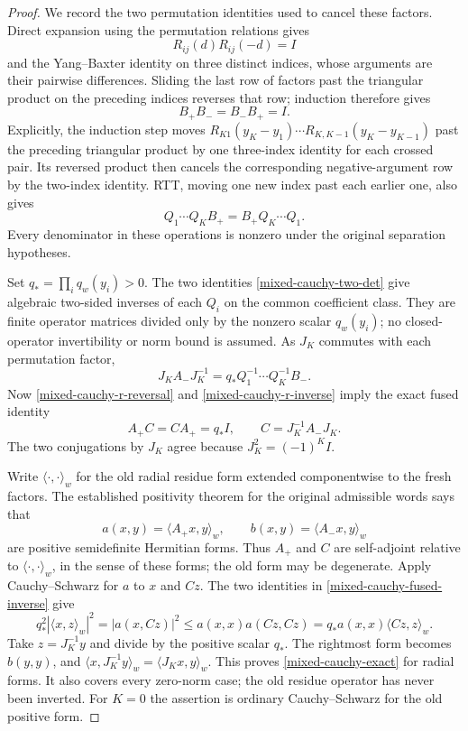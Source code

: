 \begin{proof}
We record the two permutation identities used to cancel these
factors.  Direct expansion using the permutation relations gives
\[
 R_{ij}(d)R_{ij}(-d)=I
\]
and the Yang--Baxter identity on three distinct indices, whose
arguments are their pairwise differences.  Sliding the last row
of factors past the triangular product on the preceding indices
reverses that row; induction therefore gives
\begin{equation}\label{mixed-cauchy-r-inverse}
                            B_+B_-=B_-B_+=I.
\end{equation}
Explicitly, the induction step moves
$R_{K1}(y_K-y_1)\cdots R_{K,K-1}(y_K-y_{K-1})$
past the preceding triangular product by one three-index identity
for each crossed pair.  Its reversed product then cancels the
corresponding negative-argument row by the two-index identity.
RTT, moving one new index past each earlier one, also gives
\begin{equation}\label{mixed-cauchy-r-reversal}
        Q_1\cdots Q_K B_+=B_+ Q_K\cdots Q_1.
\end{equation}
Every denominator in these operations is nonzero under the
original separation hypotheses.

Set $q_* =\prod_iq_w(y_i)>0$.  The two identities
\eqref{mixed-cauchy-two-det} give algebraic two-sided inverses
of each $Q_i$ on the common coefficient class.  They are finite
operator matrices divided only by the nonzero scalar $q_w(y_i)$;
no closed-operator invertibility or norm bound is assumed.
As $J_K$ commutes with each permutation factor,
\[
 J_K A_-J_K^{-1}=q_*Q_1^{-1}\cdots Q_K^{-1}B_-.
\]
Now \eqref{mixed-cauchy-r-reversal} and
\eqref{mixed-cauchy-r-inverse} imply the exact fused identity
\begin{equation}\label{mixed-cauchy-fused-inverse}
       A_+C=CA_+=q_*I,
       \qquad C=J_K^{-1}A_-J_K.
\end{equation}
The two conjugations by $J_K$ agree because
$J_K^2=(-1)^KI$.

Write $\langle\cdot,\cdot\rangle_w$ for the old radial
residue form extended componentwise to the fresh factors.
The established positivity theorem for the original admissible
words says that
\[
 a(x,y)=\langle A_+x,y\rangle_w,
 \qquad b(x,y)=\langle A_-x,y\rangle_w
\]
are positive semidefinite Hermitian forms.  Thus $A_+$ and $C$
are self-adjoint relative to $\langle\cdot,\cdot\rangle_w$,
in the sense of these forms; the old form may be degenerate.
Apply Cauchy--Schwarz for $a$ to $x$ and $Cz$.  The two identities
in \eqref{mixed-cauchy-fused-inverse} give
\[
 q_*^2|\langle x,z\rangle_w|^2
       =|a(x,Cz)|^2
       \le a(x,x)a(Cz,Cz)
       =q_*a(x,x)\langle Cz,z\rangle_w.
\]
Take $z=J_K^{-1}y$ and divide by the positive scalar $q_*$.
The rightmost form becomes $b(y,y)$, and
$\langle x,J_K^{-1}y\rangle_w=\langle J_Kx,y\rangle_w$.
This proves \eqref{mixed-cauchy-exact} for radial forms.  It
also covers every zero-norm case; the old residue operator has
never been inverted.  For $K=0$ the assertion is ordinary
Cauchy--Schwarz for the old positive form.


\end{proof}
